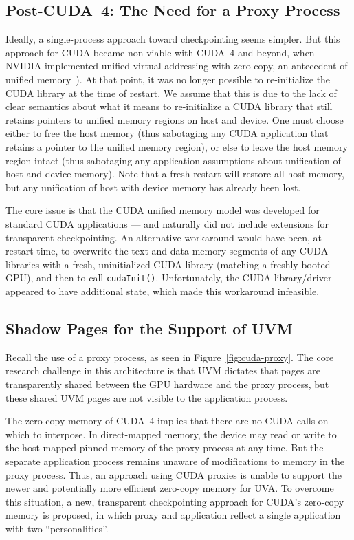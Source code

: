 \documentclass[11pt]{article}
\begin{document}
\subsection{Post-CUDA~4:  The Need for a Proxy Process}
\label{sec:proxyMotivation}

Ideally, a single-process approach toward checkpointing seems simpler.
But this approach for CUDA became non-viable with CUDA~4 and beyond, when
NVIDIA implemented unified virtual addressing with zero-copy, an antecedent
of unified memory~\cite{sakharnykh_gtc_2017}).  At that point,
it was no longer possible to re-initialize the CUDA library at the time
of restart.  We assume that this is due to the lack of clear semantics
about what it means to re-initialize a CUDA library that still retains
pointers to unified memory regions on host and device.  One must choose
either to free the host memory (thus sabotaging any CUDA application that
retains a pointer to the unified memory region), or else to leave
the host memory region intact (thus sabotaging any application assumptions
about unification of host and device memory).  Note that a fresh restart
will restore all host memory, but any unification of host with
device memory has already been lost.

The core issue is that the CUDA
unified memory model was developed for standard CUDA applications --- and
naturally did not include extensions for transparent checkpointing.
An alternative workaround would have been, at restart time, to overwrite
the text and data memory segments of any CUDA libraries with a fresh,
uninitialized CUDA library (matching a freshly booted GPU), and then to
call {\tt cudaInit()}.  Unfortunately, the CUDA library/driver appeared to have
additional state, which made this workaround infeasible.




\subsection{Shadow Pages for the Support of UVM}
\label{sec:shadow-UVM}

Recall the use of a proxy process, as seen in
Figure~\ref{fig:cuda-proxy}.  The core research challenge in this
architecture is that UVM dictates that pages are transparently
shared between the GPU hardware and the proxy process, but these
shared UVM pages are not visible to the application process.

The zero-copy memory of CUDA~4 implies that there are no CUDA calls
on which to interpose.  In direct-mapped memory, the device may
read or write to the host mapped pinned memory of the proxy process
at any time.  But the separate application process remains unaware
of modifications to memory in the proxy process.  Thus, an approach
using CUDA proxies is unable to support the newer and potentially
more efficient zero-copy memory for UVA. To overcome this situation,
a new, transparent checkpointing approach for CUDA's zero-copy
memory is proposed, in which proxy and application reflect a single
application with two ``personalities''.
\end{document}
